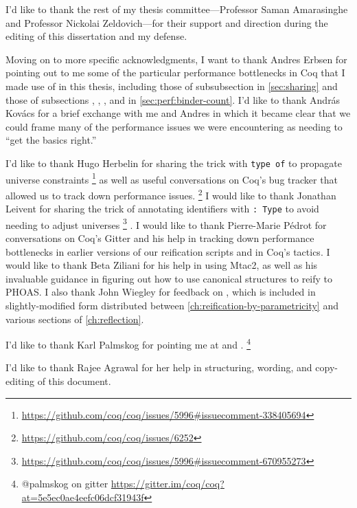 I'd like to thank the rest of my thesis committee---Professor Saman Amarasinghe and Professor Nickolai Zeldovich---for their support and direction during the editing of this dissertation and my defense.

Moving on to more specific acknowledgments, I want to thank Andres Erbsen for pointing out to me some of the particular performance bottlenecks in Coq that I made use of in this thesis, including those of subsubsection  in \autoref{sec:sharing} and those of subsections , , , and  in \autoref{sec:perf:binder-count}.
I'd like to thank András Kovács for a brief exchange with me and Andres in which it became clear that we could frame many of the performance issues we were encountering as needing to ``get the basics right.''

I'd like to thank Hugo Herbelin for sharing the trick with \texttt{type of} to propagate universe constraints%
\footnote{%
    \url{https://github.com/coq/coq/issues/5996\#issuecomment-338405694}%
}
as well as useful conversations on Coq's bug tracker that allowed us to track down performance issues.%
\footnote{%
    \url{https://github.com/coq/coq/issues/6252}%
}
I would like to thank Jonathan Leivent for sharing the trick of annotating identifiers with \texttt{: Type} to avoid needing to adjust universes%
\footnote{%
  \url{https://github.com/coq/coq/issues/5996\#issuecomment-670955273}
}%
.
I would like to thank Pierre-Marie Pédrot for conversations on Coq's Gitter and his help in tracking down performance bottlenecks in earlier versions of our reification scripts and in Coq's tactics.
I would like to thank Beta Ziliani for his help in using Mtac2, as well as his invaluable guidance in figuring out how to use canonical structures to reify to PHOAS.
I also thank John Wiegley for feedback on , which is included in slightly-modified form distributed between \autoref{ch:reification-by-parametricity} and various sections of \autoref{ch:reflection}.

I'd like to thank Karl Palmskog for pointing me at \textcite{Should1999Lamport} and \textcite{Formalising2018Paulson}.%
\footnote{@palmskog on gitter \url{https://gitter.im/coq/coq?at=5e5ec0ae4eefc06dcf31943f}}


I'd like to thank Rajee Agrawal for her help in structuring, wording, and copy-editing of this document.

